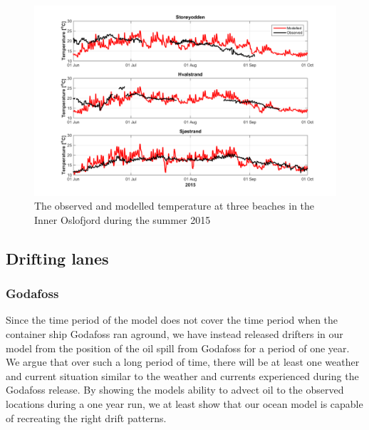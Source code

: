 \begin{figure}[ht]
\centerline{
\includegraphics*[trim=0 0 0 0,clip=true,width=\textwidth]{Figurer/badetemp_2015}
}
\caption{\small
The observed and modelled temperature at three beaches in the Inner Oslofjord during the summer 2015}
\label{fig:badetemp_2015}
\end{figure}


%
%


\clearpage 

\subsection{Drifting lanes}
\subsubsection{Godafoss}
\label{sect:godafoss_model}
Since the time period of the model does not cover the time period when the container ship Godafoss ran aground, we have instead released drifters in our model from the position of the oil spill from Godafoss for a period of one year. We argue that over such a long period of time, there will be at least one weather and current situation similar to the weather and currents experienced during the Godafoss release. By showing the models ability to advect oil to the observed locations during a one year run, we at least show that our ocean model is capable of recreating the right drift patterns.

